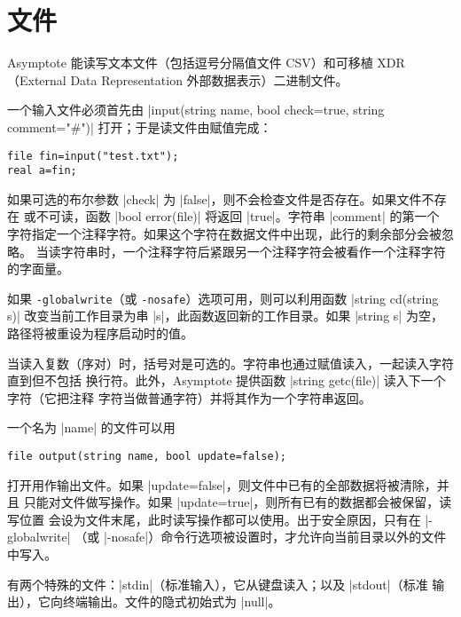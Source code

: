 \documentclass[nofonts,CJKnormalspaces]{ctexbook}[2009/05/20]
\newcommand*\prgname[1]{\textsf{#1}}
\begin{document}
\section{文件}

\prgname{Asymptote} 能读写文本文件（包括逗号分隔值文件 CSV）和可移植 XDR
（External Data Representation 外部数据表示）二进制文件。

一个输入文件必须首先由 |input(string name, bool check=true, string comment="#")|
打开；于是读文件由赋值完成：
\begin{lstlisting}
file fin=input("test.txt");
real a=fin;
\end{lstlisting}

如果可选的布尔参数 |check| 为 |false|，则不会检查文件是否存在。如果文件不存在
或不可读，函数 |bool error(file)| 将返回 |true|。字符串 |comment| 的第一个
字符指定一个注释字符。如果这个字符在数据文件中出现，此行的剩余部分会被忽略。
当读字符串时，一个注释字符后紧跟另一个注释字符会被看作一个注释字符的字面量。

如果 \verb=-globalwrite=（或 \verb=-nosafe=）选项可用，则可以利用函数
|string cd(string s)| 改变当前工作目录为串 |s|，此函数返回新的工作目录。如果
|string s| 为空，路径将被重设为程序启动时的值。

当读入复数（序对）时，括号对是可选的。字符串也通过赋值读入，一起读入字符直到但不包括
换行符。此外，\prgname{Asymptote} 提供函数 |string getc(file)| 读入下一个字符（它把注释
字符当做普通字符）并将其作为一个字符串返回。

一个名为 |name| 的文件可以用
\begin{lstlisting}
file output(string name, bool update=false);
\end{lstlisting}
打开用作输出文件。如果 |update=false|，则文件中已有的全部数据将被清除，并且
只能对文件做写操作。如果 |update=true|，则所有已有的数据都会被保留，读写位置
会设为文件末尾，此时读写操作都可以使用。出于安全原因，只有在 |-globalwrite|
（或 |-nosafe|）命令行选项被设置时，才允许向当前目录以外的文件中写入。

有两个特殊的文件：|stdin|（标准输入），它从键盘读入；以及 |stdout|（标准
输出），它向终端输出。文件的隐式初始式为 |null|。
\end{document}
